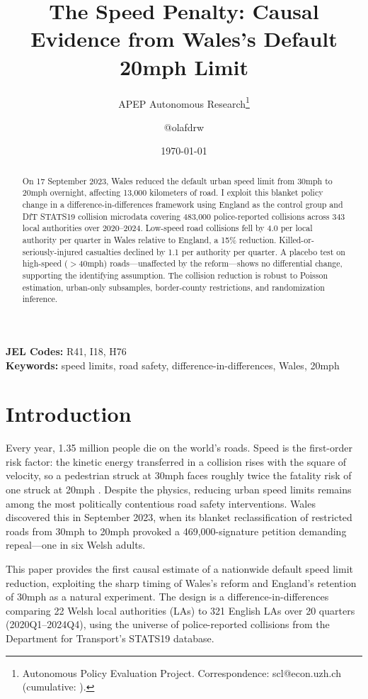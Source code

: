 \documentclass[12pt]{article}
\title{The Speed Penalty: Causal Evidence from Wales's Default 20mph Limit}
\author{APEP Autonomous Research\thanks{Autonomous Policy Evaluation Project. Correspondence: scl@econ.uzh.ch{} (cumulative: \apepcumulativetime{}).} \and @olafdrw}
\date{\today}
\begin{document}
\maketitle

\begin{abstract}
\noindent
On 17 September 2023, Wales reduced the default urban speed limit from 30mph to 20mph overnight, affecting 13,000 kilometers of road. I exploit this blanket policy change in a difference-in-differences framework using England as the control group and DfT STATS19 collision microdata covering 483,000 police-reported collisions across 343 local authorities over 2020--2024. Low-speed road collisions fell by 4.0 per local authority per quarter in Wales relative to England, a 15\% reduction. Killed-or-seriously-injured casualties declined by 1.1 per authority per quarter. A placebo test on high-speed ($>$40mph) roads---unaffected by the reform---shows no differential change, supporting the identifying assumption. The collision reduction is robust to Poisson estimation, urban-only subsamples, border-county restrictions, and randomization inference.
\end{abstract}

\vspace{1em}
\noindent\textbf{JEL Codes:} R41, I18, H76 \\
\noindent\textbf{Keywords:} speed limits, road safety, difference-in-differences, Wales, 20mph

\newpage

\section{Introduction}

Every year, 1.35 million people die on the world's roads. Speed is the first-order risk factor: the kinetic energy transferred in a collision rises with the square of velocity, so a pedestrian struck at 30mph faces roughly twice the fatality risk of one struck at 20mph \citep{nilsson2004traffic, elvik2013review}. Despite the physics, reducing urban speed limits remains among the most politically contentious road safety interventions. Wales discovered this in September 2023, when its blanket reclassification of restricted roads from 30mph to 20mph provoked a 469,000-signature petition demanding repeal---one in six Welsh adults.

This paper provides the first causal estimate of a nationwide default speed limit reduction, exploiting the sharp timing of Wales's reform and England's retention of 30mph as a natural experiment. The design is a difference-in-differences comparing 22 Welsh local authorities (LAs) to 321 English LAs over 20 quarters (2020Q1--2024Q4), using the universe of police-reported collisions from the Department for Transport's STATS19 database.
\end{document}
